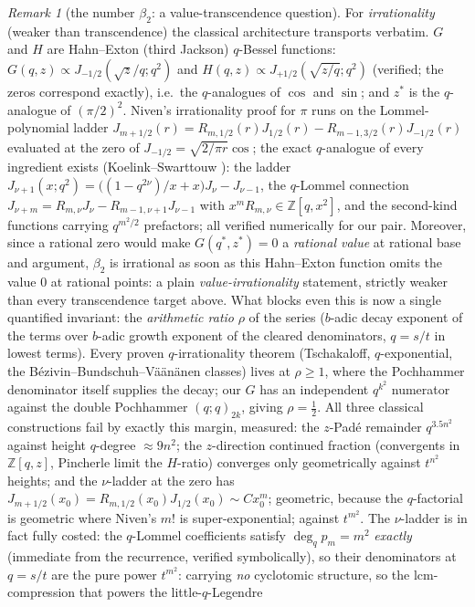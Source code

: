 \documentclass[11pt]{article}
\theoremstyle{plain}
\theoremstyle{definition}
\theoremstyle{remark}
\newtheorem{remark}[theorem]{Remark}
\newcommand{\Z}{\mathbb{Z}}
\begin{document}
\begin{remark}[the number $\beta_2$: a value-transcendence question]
For \emph{irrationality} (weaker than transcendence) the classical architecture transports verbatim.
$G$ and $H$ are Hahn--Exton (third Jackson) $q$-Bessel functions: $G(q,z)\propto
J_{-1/2}(\sqrt z/q;q^2)$ and $H(q,z)\propto J_{+1/2}(\sqrt{z/q};q^2)$ (verified; the zeros correspond
exactly), i.e.\ the $q$-analogues of $\cos$ and $\sin$; and $z^\ast$ is the $q$-analogue of
$(\pi/2)^2$. Niven's irrationality proof for $\pi$ runs on the Lommel-polynomial ladder
$J_{m+1/2}(r)=R_{m,1/2}(r)J_{1/2}(r)-R_{m-1,3/2}(r)J_{-1/2}(r)$ evaluated at the zero of $J_{-1/2}=
\sqrt{2/\pi r}\cos$; the exact $q$-analogue of every ingredient exists (Koelink--Swarttouw \cite{KoelinkSwarttouw1994}): the ladder
$J_{\nu+1}(x;q^2)=\bigl((1-q^{2\nu})/x+x\bigr)J_\nu-J_{\nu-1}$, the $q$-Lommel connection
$J_{\nu+m}=R_{m,\nu}J_\nu-R_{m-1,\nu+1}J_{\nu-1}$ with $x^mR_{m,\nu}\in\Z[q,x^2]$, and the second-kind
functions carrying $q^{m^2/2}$ prefactors; all verified numerically for our pair. Moreover, since a
rational zero would make $G(q^\ast,z^\ast)=0$ a \emph{rational value} at rational base and argument,
$\beta_2$ is irrational as soon as this Hahn--Exton function omits the value $0$ at rational points: a plain \emph{value-irrationality} statement, strictly weaker than every transcendence target above.
What blocks even this is now a single quantified invariant: the \emph{arithmetic ratio} $\rho$ of the
series ($b$-adic decay exponent of the terms over $b$-adic growth exponent of the cleared denominators,
$q=s/t$ in lowest terms). Every proven $q$-irrationality theorem (Tschakaloff, $q$-exponential, the
B\'ezivin--Bundschuh--V\"a\"an\"anen classes) lives at $\rho\ge1$, where the Pochhammer denominator
itself supplies the decay; our $G$ has an independent $q^{k^2}$ numerator against the double Pochhammer
$(q;q)_{2k}$, giving $\rho=\tfrac12$. All three classical constructions fail by exactly this margin,
measured: the $z$-Pad\'e remainder $q^{3.5n^2}$ against height $q$-degree $\approx9n^2$; the
$z$-direction continued fraction (convergents in $\Z[q,z]$, Pincherle limit the $H$-ratio) converges
only geometrically against $t^{n^2}$ heights; and the $\nu$-ladder at the zero has
$J_{m+1/2}(x_0)=R_{m,1/2}(x_0)J_{1/2}(x_0)\sim Cx_0^m$; geometric, because the $q$-factorial is
geometric where Niven's $m!$ is super-exponential; against $t^{m^2}$. The $\nu$-ladder is in fact
fully costed: the $q$-Lommel coefficients satisfy $\deg_q p_m=m^2$ \emph{exactly} (immediate from the
recurrence, verified symbolically), so their denominators at $q=s/t$ are the pure power $t^{m^2}$: carrying \emph{no} cyclotomic structure, so the lcm-compression that powers the little-$q$-Legendre

\end{remark}
\end{document}
